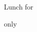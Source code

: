 \documentclass[a4paper]{article}
\begin{document}
\printGenericVSLHeader
\begin{center}
\begin{vsltext}{2.5cm}{4cm}

   Lunch for

    \vspace{0.5cm}

    {}

    \vspace{0.5cm}

    only

\end{vsltext}

\end{center}
\end{document}
